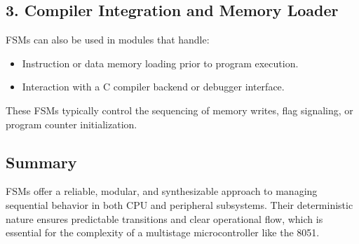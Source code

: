 \subsection*{3. Compiler Integration and Memory Loader}

FSMs can also be used in modules that handle:
\begin{itemize}
    \item Instruction or data memory loading prior to program execution.
    \item Interaction with a C compiler backend or debugger interface.
\end{itemize}

These FSMs typically control the sequencing of memory writes, flag signaling, or program counter initialization.

\subsection*{Summary}

FSMs offer a reliable, modular, and synthesizable approach to managing sequential behavior in both CPU and peripheral subsystems. Their deterministic nature ensures predictable transitions and clear operational flow, which is essential for the complexity of a multistage microcontroller like the 8051.
